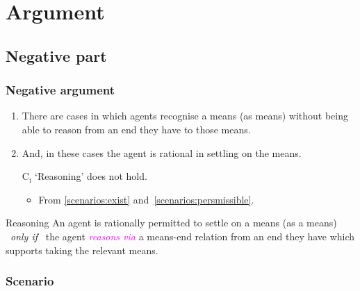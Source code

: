 \documentclass[noamssymb, compress, handout]{beamer} %
\newcommand{\hozlinedash}[0]{%
  \noindent\hdashrule[0.5ex][c]{\textwidth}{.1pt}{2.5pt}
}
\begin{document}
\section{Argument}
\label{sec:argument}


\subsection{Negative part}
\label{sec:negative}

\begin{frame}
  \frametitle{Negative argument}

  \begin{enumerate}
  \item\label{scenarios:exist} There are cases in which agents recognise a means (as means) without being able to reason from an end they have to those means.
  \item\label{scenarios:persmissible} And, in these cases the agent is rational in settling on the means.

  \item[C\(_{\text{i}}\)] `Reasoning' does not hold.
    \begin{itemize}
    \item From \ref{scenarios:exist} and~\ref{scenarios:persmissible}.
    \end{itemize}
  \end{enumerate}

  \hozlinedash
  {\footnotesize
    \begin{block}{Reasoning}
      An agent is rationally permitted to settle on a means (as a means)
      \newline
      \mbox{ }\hfill\emph{only if}\hfill\mbox{ }
      \newline
      the agent \textcolor{fuchsia}{\emph{reasons via}}  a means-end relation from an end they have which supports taking the relevant means.
    \end{block}
  }
\end{frame}

\subsubsection{Scenario}
\label{sec:case}
\end{document}
